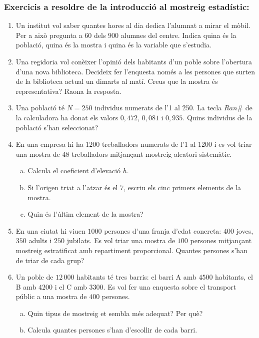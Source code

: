 \subsubsection{Exercicis a resoldre de la introducció al mostreig estadístic:}
\begin{enumerate}
 \item Un institut vol saber quantes hores al dia dedica l'alumnat a mirar el mòbil. Per a això pregunta a $60$ dels $900$ alumnes del centre. Indica quina és la població, quina és la mostra i quina és la variable que s'estudia.

 \item Una regidoria vol conèixer l'opinió dels habitants d'un poble sobre l'obertura d'una nova biblioteca. Decideix fer l'enquesta només a les persones que surten de la biblioteca actual un dimarts al matí. Creus que la mostra és representativa? Raona la resposta.

 \item Una població té $N=250$ individus numerats de l'1 al 250. La tecla $Ran\#$ de la calculadora ha donat els valors $0,472$, $0,081$ i $0,935$. Quins individus de la població s'han seleccionat?

 \item En una empresa hi ha $1200$ treballadors numerats de l'1 al 1200 i es vol triar una mostra de $48$ treballadors mitjançant mostreig aleatori sistemàtic.
 \begin{enumerate}[a)]
  \item Calcula el coeficient d'elevació $h$.
  \item Si l'origen triat a l'atzar és el $7$, escriu els cinc primers elements de la mostra.
  \item Quin és l'últim element de la mostra?
 \end{enumerate}

 \item En una ciutat hi viuen $1000$ persones d'una franja d'edat concreta: $400$ joves, $350$ adults i $250$ jubilats. Es vol triar una mostra de $100$ persones mitjançant mostreig estratificat amb repartiment proporcional. Quantes persones s'han de triar de cada grup?

 \item Un poble de $12\,000$ habitants té tres barris: el barri A amb $4500$ habitants, el B amb $4200$ i el C amb $3300$. Es vol fer una enquesta sobre el transport públic a una mostra de $400$ persones.
 \begin{enumerate}[a)]
  \item Quin tipus de mostreig et sembla més adequat? Per què?
  \item Calcula quantes persones s'han d'escollir de cada barri.
 \end{enumerate}


\end{enumerate}
